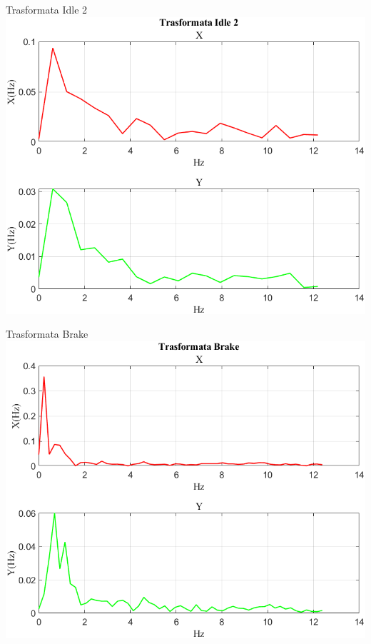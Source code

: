 \documentclass[beamer]{standalone}
\begin{document}
	\begin{frame}{{Trasformata Idle 2}}
		\centering\includegraphics[height=.8\textheight]{figure/Vel/Trasformata/Trasformata Idle 2}
	\end{frame}
	
	\begin{frame}{{Trasformata Brake}}
		\centering\includegraphics[height=.8\textheight]{figure/Vel/Trasformata/Trasformata Brake}
	\end{frame}
	
\end{document}
